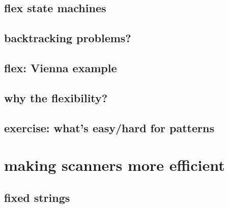 \graphicspath{{./figures/}}
\title{}
\date{}

\begin{frame}
    \titlepage
\end{frame}


\usetikzlibrary{arrows.meta,calc,fit,matrix,positioning,shapes.callouts}

\subsection{flex state machines}






\subsection{backtracking problems?}




\subsection{flex: Vienna example}


\subsection{why the flexibility?}

\subsection{exercise: what's easy/hard for patterns}


\section{making scanners more efficient}


\subsection{fixed strings}


